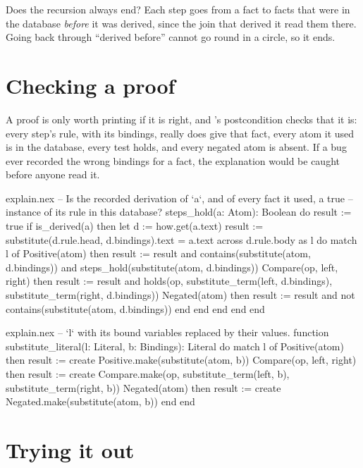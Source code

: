 Does the recursion always end? Each step goes from a fact to facts that were
in the database \emph{before} it was derived, since the join that derived it
read them there. Going back through ``derived before'' cannot go round in a
circle, so it ends.

\section{Checking a proof}

A proof is only worth printing if it is right, and 's
postcondition checks that it is: every step's rule, with its bindings,
really does give that fact, every atom it used is in the database, every
test holds, and every negated atom is absent. If a bug ever recorded the
wrong bindings for a fact, the explanation would be caught before anyone
read it.

\begin{continued}{explain.nex}
  -- Is the recorded derivation of `a`, and of every fact it used, a true
  -- instance of its rule in this database?
  steps_hold(a: Atom): Boolean
  do
    result := true
    if is_derived(a) then
      let d := how.get(a.text)
      result := substitute(d.rule.head, d.bindings).text = a.text
      across d.rule.body as l do
        match l of
          Positive(atom) then
            result := result and contains(substitute(atom, d.bindings))
                      and steps_hold(substitute(atom, d.bindings))
          Compare(op, left, right) then
            result := result and holds(op, substitute_term(left, d.bindings),
                                       substitute_term(right, d.bindings))
          Negated(atom) then
            result := result and not contains(substitute(atom, d.bindings))
        end
      end
    end
  end
end
\end{continued}

\begin{continued}{explain.nex}
-- `l` with its bound variables replaced by their values.
function substitute_literal(l: Literal, b: Bindings): Literal
do
  match l of
    Positive(atom) then result := create Positive.make(substitute(atom, b))
    Compare(op, left, right) then
      result := create Compare.make(op, substitute_term(left, b), substitute_term(right, b))
    Negated(atom) then result := create Negated.make(substitute(atom, b))
  end
end
\end{continued}

\section{Trying it out}

